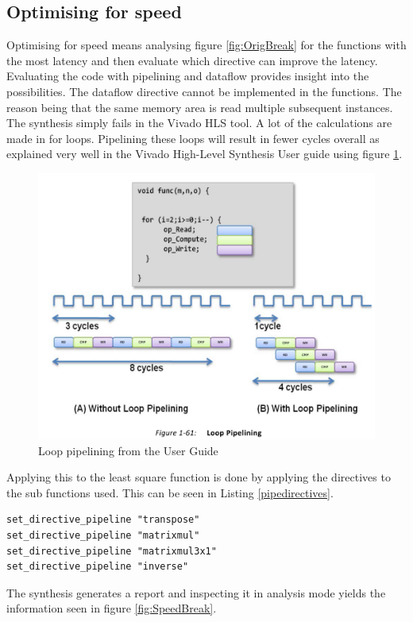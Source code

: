 \subsection{Optimising for speed}
Optimising for speed means analysing figure \ref{fig:OrigBreak} for the functions with the most latency and then evaluate which directive can improve the latency. Evaluating the code with pipelining and dataflow provides insight into the possibilities. The dataflow directive cannot be implemented in the functions. The reason being that the same memory area is read multiple subsequent instances. The synthesis simply fails in the Vivado HLS tool.
A lot of the calculations are made in for loops. Pipelining these loops will result in fewer cycles overall as explained very well in the Vivado High-Level Synthesis User guide using figure \ref{fig:looppipelining}.
\begin{figure}[H]
\centering
\includegraphics[scale=1]{billeder/looppipelining}
\caption{Loop pipelining from the User Guide}
\label{fig:looppipelining}
\end{figure}
Applying this to the least square function is done by applying the directives to the sub functions used. This can be seen in Listing \ref{pipedirectives}.
\begin{lstlisting}[caption={pipelining directives applied to the least squares sub functions},label=pipedirectives]
set_directive_pipeline "transpose"
set_directive_pipeline "matrixmul"
set_directive_pipeline "matrixmul3x1"
set_directive_pipeline "inverse"
\end{lstlisting}
The synthesis generates a report and inspecting it in analysis mode yields the information seen in figure \ref{fig:SpeedBreak}.
